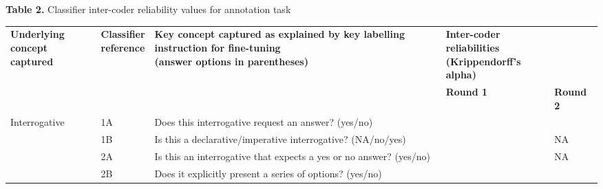 \documentclass{article}
\newlength{\tabletotalwidth}
\begin{document}
\hspace*{0.5cm}\textbf{Table 2.} Classifier inter-coder reliability values for annotation task

\vspace{0.5em}

\noindent\begin{minipage}{\tabletotalwidth}
\fontsize{10}{12}\selectfont %

\renewcommand{\arraystretch}{1.2}
\begin{tabular}{%
  p{2.8cm} p{1.3cm} p{7.1cm}
  >{\centering\arraybackslash}p{2.1cm}
  >{\centering\arraybackslash}p{2.1cm}}
\toprule
\parbox[t]{2.8cm}{\centering\textbf{Underlying concept}\\\textbf{captured}} &
\parbox[t]{1.3cm}{\centering\textbf{Classifier}\\\textbf{reference}} &
\parbox[t]{7.1cm}{\centering\textbf{Key concept captured as explained by key labelling instruction for fine-tuning}\\\textbf{(answer options in parentheses)}} &
%
{\parbox[t]{\dimexpr 2.1cm + 2.1cm + 2\tabcolsep\relax}{\centering\textbf{Inter-coder reliabilities}\\\textbf{(Krippendorff’s alpha)}}} \\
\cmidrule(lr){4-5}
 &  &  & \textbf{Round 1} & \textbf{Round 2} \\
\midrule
\parbox[t]{2.80cm}{Interrogative} & \parbox[t]{1.30cm}{1A} & \parbox[t]{7.10cm}{Does this interrogative request an answer? (yes/no)} & \parbox[t]{2.10cm}{} & \parbox[t]{2.10cm}{} \\
\addlinespace[0.7em]
\parbox[t]{2.80cm}{} & \parbox[t]{1.30cm}{1B} & \parbox[t]{7.10cm}{Is this a declarative/imperative interrogative? (NA/no/yes)} & \parbox[t]{2.10cm}{} & \parbox[t]{2.10cm}{\centering NA} \\
\addlinespace[0.7em]
\parbox[t]{2.80cm}{Selection-size-specification} & \parbox[t]{1.30cm}{2A} & \parbox[t]{7.10cm}{Is this an interrogative that expects a yes or no answer? (yes/no)} & \parbox[t]{2.10cm}{} & \parbox[t]{2.10cm}{\centering NA} \\
\addlinespace[0.7em]
\parbox[t]{2.80cm}{} & \parbox[t]{1.30cm}{2B} & \parbox[t]{7.10cm}{Does it explicitly present a series of options? (yes/no)} & \parbox[t]{2.10cm}{} & \parbox[t]{2.10cm}{} \\

\end{tabular}
\end{minipage}
\end{document}
